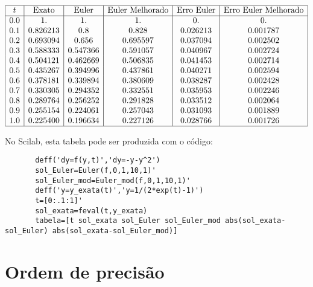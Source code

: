 \begin{Answer}\begin{tiny}
 $$\begin{array}{|c|c|c|c|c|c|}
\hline
t &  \hbox{Exato} & \hbox{Euler} & \hbox{Euler Melhorado} & \hbox{Erro Euler} & \hbox{Erro Euler Melhorado}\\
\hline
0.0&    1.          &1.          &1.          &0.          &0.       \\ 
0.1&    0.826213    &0.8         &0.828       &0.026213    &0.001787\\  
0.2&    0.693094    &0.656       &0.695597    &0.037094    &0.002502  \\
0.3&    0.588333    &0.547366    &0.591057    &0.040967    &0.002724  \\
0.4&    0.504121    &0.462669    &0.506835    &0.041453    &0.002714  \\
0.5&    0.435267    &0.394996    &0.437861    &0.040271    &0.002594  \\
0.6&    0.378181    &0.339894    &0.380609    &0.038287    &0.002428  \\
0.7&    0.330305    &0.294352    &0.332551    &0.035953    &0.002246  \\
0.8&    0.289764    &0.256252    &0.291828    &0.033512    &0.002064  \\
0.9&    0.255154    &0.224061    &0.257043    &0.031093    &0.001889  \\
1.0&    0.225400    &0.196634    &0.227126    &0.028766    &0.001726\\

\hline
\end{array}
$$

\ifisscilab
      No Scilab, esta tabela pode ser produzida com o código:
      \begin{verbatim}
       deff('dy=f(y,t)','dy=-y-y^2')
       sol_Euler=Euler(f,0,1,10,1)'
       sol_Euler_mod=Euler_mod(f,0,1,10,1)'
       deff('y=y_exata(t)','y=1/(2*exp(t)-1)')
       t=[0:.1:1]'
       sol_exata=feval(t,y_exata)
       tabela=[t sol_exata sol_Euler sol_Euler_mod abs(sol_exata-sol_Euler) abs(sol_exata-sol_Euler_mod)]
      \end{verbatim}

    \fi
 \end{tiny}
\end{Answer}


\section{Ordem de precisão}

